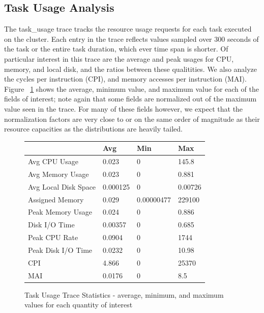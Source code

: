 \documentclass{sig-alternate}
\begin{document}



\subsection{Task Usage Analysis}

The task\_usage trace tracks the resource usage requests for each task executed on the cluster.
Each entry in the trace reflects values sampled over 300 seconds of the task or the entire task duration, which ever time span is shorter.
Of particular interest in this trace are the average and peak usages for CPU, memory, and local disk, and the ratios between these qualitities.
We also analyze the cycles per instruction (CPI), and memory accesses per instruction (MAI).
Figure ~\ref{task_usage_stats} shows the average, minimum value, and maximum value for each of the fields of interest; note again that some fields are normalized out of the maximum value seen in the trace.
For many of these fields however, we expect that the normalization factors are very close to or on the same order of magnitude as their resource capacities as the distributions are heavily tailed.

\begin{figure}
\centering
\begin{tabular}{| p{2.5cm} | p{1.5cm} | p{1.5cm} | p{1.5cm} |} \hline
 & Avg & Min & Max \\ \hline
Avg CPU Usage & 0.023 & 0 & 145.8 \\ \hline
Avg Memory Usage & 0.023 & 0 & 0.881 \\ \hline
Avg Local Disk Space & 0.000125 & 0 & 0.00726 \\ \hline
Assigned Memory & 0.029 & 0.00000477 & 229100\* \\ \hline
Peak Memory Usage & 0.024 & 0 & 0.886 \\ \hline
Disk I/O Time & 0.00357 & 0 & 0.685 \\ \hline
Peak CPU Rate & 0.0904 & 0 & 1744\* \\ \hline
Peak Disk I/O Time & 0.0232 & 0 & 10.98 \\ \hline
CPI & 4.866 & 0 & 25370\* \\ \hline
MAI & 0.0176 & 0 & 8.5\* \\ \hline
\end{tabular}
\caption{Task Usage Trace Statistics - average, minimum, and maximum values for each quantity of interest}
\label{task_usage_stats}
\end{figure}
\end{document}
